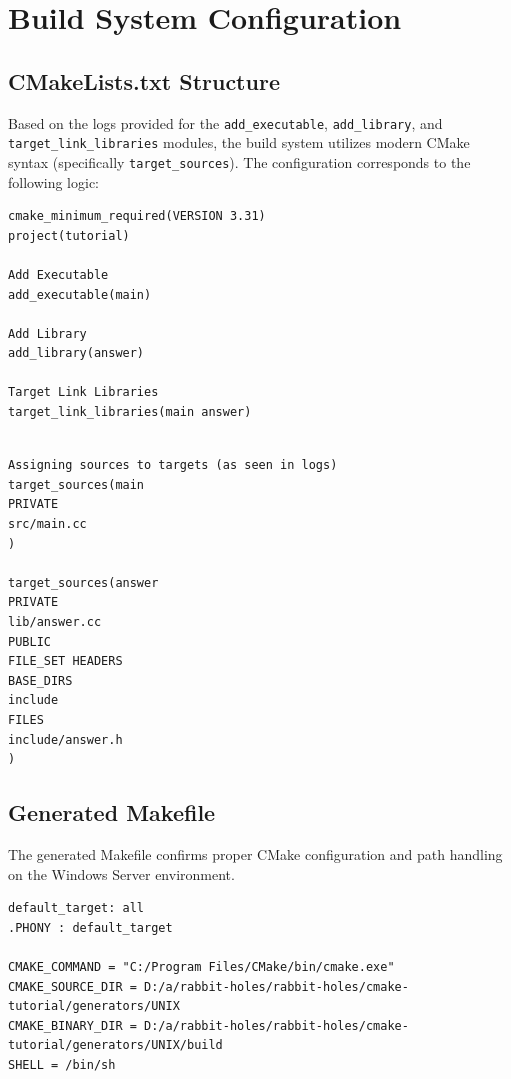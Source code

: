 \section{Build System Configuration}

\subsection{CMakeLists.txt Structure}
Based on the logs provided for the {\tt add\_executable}, {\tt add\_library}, and {\tt target\_link\_libraries} modules, the build system utilizes modern CMake syntax (specifically {\tt target\_sources}). The configuration corresponds to the following logic:

\begin{verbatim}
cmake_minimum_required(VERSION 3.31)
project(tutorial)

Add Executable
add_executable(main)

Add Library
add_library(answer)

Target Link Libraries
target_link_libraries(main answer)
\end{verbatim}

\begin{verbatim}

Assigning sources to targets (as seen in logs)
target_sources(main
PRIVATE
src/main.cc
)

target_sources(answer
PRIVATE
lib/answer.cc
PUBLIC
FILE_SET HEADERS
BASE_DIRS
include
FILES
include/answer.h
)
\end{verbatim}

\subsection{Generated Makefile}
The generated Makefile confirms proper CMake configuration and path handling on the Windows Server environment.

\begin{verbatim}
default_target: all
.PHONY : default_target

CMAKE_COMMAND = "C:/Program Files/CMake/bin/cmake.exe"
CMAKE_SOURCE_DIR = D:/a/rabbit-holes/rabbit-holes/cmake-tutorial/generators/UNIX
CMAKE_BINARY_DIR = D:/a/rabbit-holes/rabbit-holes/cmake-tutorial/generators/UNIX/build
SHELL = /bin/sh
\end{verbatim}
